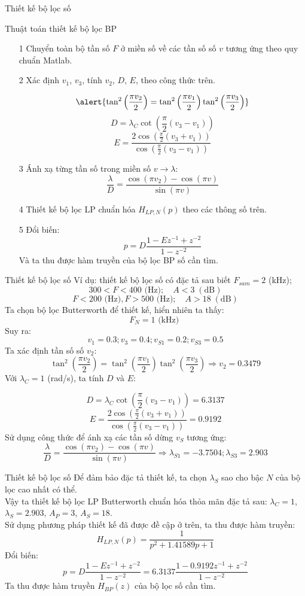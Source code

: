 \documentclass[8pt]{beamer}
\begin{document}
\begin{frame}{Thiết kế bộ lọc số}
\begin{block}{Thuật toán thiết kế bộ lọc BP}
	\begin{enumerate}
		\item[1] Chuyển toàn bộ tần số $F$ ở miền số về các tần số số $v$ tương ứng theo quy chuẩn Matlab.
		\item[2] Xác định $v_{1}$, $v_{3}$, tính $v_{2}$, $D$, $E$, theo công thức trên.

			$$\alert{\tan^2{\left(\frac{\pi v_{2}}{2}\right)}=\tan^2{\left(\frac{\pi v_{1}}{2}\right)}\tan^2{\left(\frac{\pi v_{3}}{2}\right)}}$$
$$D=\lambda_{C}\cot{\left(\frac{\pi}{2}(v_{3}-v_{1})\right)}$$
	$$E=\frac{2\cos{\left(\frac{\pi}{2}(v_{3}+v_{1})\right)}}{\cos{\left(\frac{\pi}{2}(v_{3}-v_{1})\right)}}$$
\item[3] Ánh xạ từng tần số trong miền số $v\to\lambda$:
	$$\frac{\lambda}{D}=\frac{\cos(\pi v_{2})-\cos(\pi v)}{\sin(\pi v)}$$
\item[4] Thiết kế bộ lọc LP chuẩn hóa $H_{LP,N}(p)$ theo các thông số trên.
\item[5] Đổi biến:
$$p=D\frac{1-Ez^{-1}+z^{-2}}{1-z^{-2}}$$
Và ta thu được hàm truyền của bộ lọc BP số cần tìm.

	\end{enumerate}
	\end{block}
\end{frame}
\begin{frame}{Thiết kế bộ lọc số}
Ví dụ: thiết kế bộ lọc số có đặc tả sau biết $F_{sam}=2$ (kHz);
$$300<F<400\text{ (Hz)};\quad A<3\;(\text{dB})$$
$$F<200\text{ (Hz)},F>500\text{ (Hz)};\quad A>18\;(\text{dB})$$
Ta chọn bộ lọc Butterworth để thiết kế, hiển nhiên ta thấy:
$$F_{N}=1\text{ (kHz) }$$
Suy ra: $$v_{1}=0.3;v_{3}=0.4;v_{S1}=0.2;v_{S3}=0.5$$
Ta xác định tần số số $v_{2}$:
$$\tan^2{\left(\frac{\pi v_{2}}{2}\right)}=\tan^2{\left(\frac{\pi v_{1}}{2}\right)}\tan^2{\left(\frac{\pi v_{3}}{2}\right)}\Rightarrow v_{2}=0.3479$$
Với \alert{$\lambda_{C}=1$ (rad/s)}, ta tính $D$ và $E$:

$$D=\lambda_{C}\cot{\left(\frac{\pi}{2}(v_{3}-v_{1})\right)}=6.3137$$
	$$E=\frac{2\cos{\left(\frac{\pi}{2}(v_{3}+v_{1})\right)}}{\cos{\left(\frac{\pi}{2}(v_{3}-v_{1})\right)}}=0.9192$$
	Sử dụng công thức để ánh xạ các tần số dừng $v_{S}$ tương ứng:
	$$\frac{\lambda}{D}=\frac{\cos(\pi v_{2})-\cos(\pi v)}{\sin(\pi v)}\Rightarrow \lambda_{S1}=-3.7504;\lambda_{S3}=2.903$$
\end{frame}
\begin{frame}{Thiết kế bộ lọc số}
Để đảm bảo đặc tả thiết kế, ta chọn $\lambda_{S}$ sao cho bậc $N$ của bộ lọc cao nhất có thể.
\\ Vậy ta thiết kế bộ lọc LP Butterworth chuẩn hóa thỏa mãn đặc tả sau: $\lambda_{C}=1$, $\lambda_{S}=2.903$, $A_{P}=3$, $A_{S}=18$.
\\ Sử dụng phương pháp thiết kế đã được đề cập ở trên, ta thu được hàm truyền:
$$H_{LP,N}(p)=\frac{1}{p^2+1.41589p+1}$$
Đổi biến:
$$p=D\frac{1-Ez^{-1}+z^{-2}}{1-z^{-2}}=6.3137\frac{1-0.9192z^{-1}+z^{-2}}{1-z^{-2}}$$
Ta thu được hàm truyền $H_{BP}(z)$ của bộ lọc số cần tìm.
\end{frame}
\end{document}
